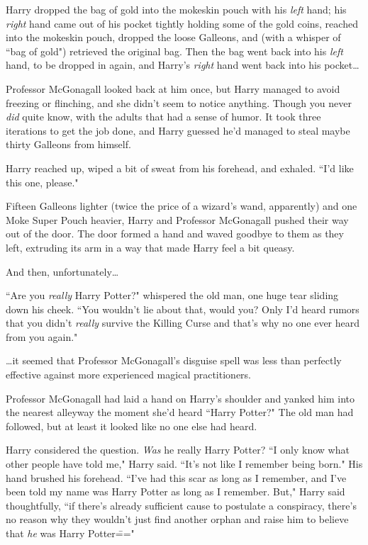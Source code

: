 Harry dropped the bag of gold into the mokeskin pouch with his \emph{left} hand; his \emph{right} hand came out of his pocket tightly holding some of the gold coins, reached into the mokeskin pouch, dropped the loose Galleons, and (with a whisper of ``bag of gold") retrieved the original bag. Then the bag went back into his \emph{left} hand, to be dropped in again, and Harry's \emph{right} hand went back into his pocket{\ldots}

Professor McGonagall looked back at him once, but Harry managed to avoid freezing or flinching, and she didn't seem to notice anything. Though you never \emph{did} quite know, with the adults that had a sense of humor. It took three iterations to get the job done, and Harry guessed he'd managed to steal maybe thirty Galleons from himself.

Harry reached up, wiped a bit of sweat from his forehead, and exhaled. ``I'd like this one, please."

Fifteen Galleons lighter (twice the price of a wizard's wand, apparently) and one Moke Super Pouch  heavier, Harry and Professor McGonagall pushed their way out of the door. The door formed a hand and waved goodbye to them as they left, extruding its arm in a way that made Harry feel a bit queasy.

And then, unfortunately{\ldots}

``Are you \emph{really} Harry Potter?" whispered the old man, one huge tear sliding down his cheek. ``You wouldn't lie about that, would you? Only I'd heard rumors that you didn't \emph{really} survive the Killing Curse and that's why no one ever heard from you again."

{\ldots}it seemed that Professor McGonagall's disguise spell was less than perfectly effective against more experienced magical practitioners.

Professor McGonagall had laid a hand on Harry's shoulder and yanked him into the nearest alleyway the moment she'd heard ``Harry Potter?" The old man had followed, but at least it looked like no one else had heard.

Harry considered the question. \emph{Was} he really Harry Potter? ``I only know what other people have told me," Harry said. ``It's not like I remember being born." His hand brushed his forehead. ``I've had this scar as long as I remember, and I've been told my name was Harry Potter as long as I remember. But," Harry said thoughtfully, ``if there's already sufficient cause to postulate a conspiracy, there's no reason why they wouldn't just find another orphan and raise him to believe that \emph{he} was Harry Potter\==="

